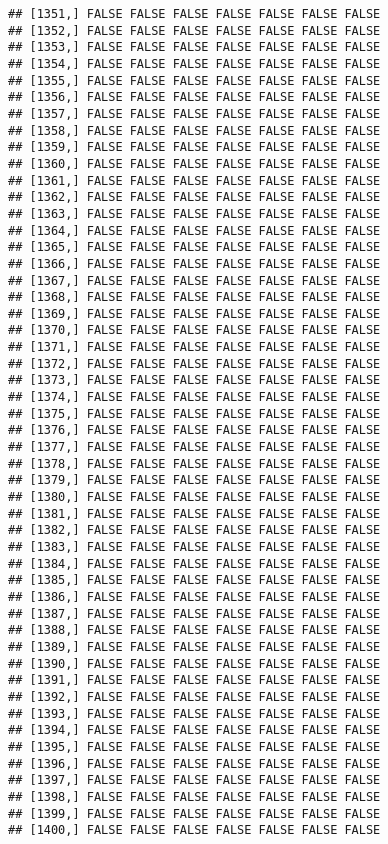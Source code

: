 \documentclass[
]{article}
\begin{document}
\begin{verbatim}
## [1351,] FALSE FALSE FALSE FALSE FALSE FALSE FALSE
## [1352,] FALSE FALSE FALSE FALSE FALSE FALSE FALSE
## [1353,] FALSE FALSE FALSE FALSE FALSE FALSE FALSE
## [1354,] FALSE FALSE FALSE FALSE FALSE FALSE FALSE
## [1355,] FALSE FALSE FALSE FALSE FALSE FALSE FALSE
## [1356,] FALSE FALSE FALSE FALSE FALSE FALSE FALSE
## [1357,] FALSE FALSE FALSE FALSE FALSE FALSE FALSE
## [1358,] FALSE FALSE FALSE FALSE FALSE FALSE FALSE
## [1359,] FALSE FALSE FALSE FALSE FALSE FALSE FALSE
## [1360,] FALSE FALSE FALSE FALSE FALSE FALSE FALSE
## [1361,] FALSE FALSE FALSE FALSE FALSE FALSE FALSE
## [1362,] FALSE FALSE FALSE FALSE FALSE FALSE FALSE
## [1363,] FALSE FALSE FALSE FALSE FALSE FALSE FALSE
## [1364,] FALSE FALSE FALSE FALSE FALSE FALSE FALSE
## [1365,] FALSE FALSE FALSE FALSE FALSE FALSE FALSE
## [1366,] FALSE FALSE FALSE FALSE FALSE FALSE FALSE
## [1367,] FALSE FALSE FALSE FALSE FALSE FALSE FALSE
## [1368,] FALSE FALSE FALSE FALSE FALSE FALSE FALSE
## [1369,] FALSE FALSE FALSE FALSE FALSE FALSE FALSE
## [1370,] FALSE FALSE FALSE FALSE FALSE FALSE FALSE
## [1371,] FALSE FALSE FALSE FALSE FALSE FALSE FALSE
## [1372,] FALSE FALSE FALSE FALSE FALSE FALSE FALSE
## [1373,] FALSE FALSE FALSE FALSE FALSE FALSE FALSE
## [1374,] FALSE FALSE FALSE FALSE FALSE FALSE FALSE
## [1375,] FALSE FALSE FALSE FALSE FALSE FALSE FALSE
## [1376,] FALSE FALSE FALSE FALSE FALSE FALSE FALSE
## [1377,] FALSE FALSE FALSE FALSE FALSE FALSE FALSE
## [1378,] FALSE FALSE FALSE FALSE FALSE FALSE FALSE
## [1379,] FALSE FALSE FALSE FALSE FALSE FALSE FALSE
## [1380,] FALSE FALSE FALSE FALSE FALSE FALSE FALSE
## [1381,] FALSE FALSE FALSE FALSE FALSE FALSE FALSE
## [1382,] FALSE FALSE FALSE FALSE FALSE FALSE FALSE
## [1383,] FALSE FALSE FALSE FALSE FALSE FALSE FALSE
## [1384,] FALSE FALSE FALSE FALSE FALSE FALSE FALSE
## [1385,] FALSE FALSE FALSE FALSE FALSE FALSE FALSE
## [1386,] FALSE FALSE FALSE FALSE FALSE FALSE FALSE
## [1387,] FALSE FALSE FALSE FALSE FALSE FALSE FALSE
## [1388,] FALSE FALSE FALSE FALSE FALSE FALSE FALSE
## [1389,] FALSE FALSE FALSE FALSE FALSE FALSE FALSE
## [1390,] FALSE FALSE FALSE FALSE FALSE FALSE FALSE
## [1391,] FALSE FALSE FALSE FALSE FALSE FALSE FALSE
## [1392,] FALSE FALSE FALSE FALSE FALSE FALSE FALSE
## [1393,] FALSE FALSE FALSE FALSE FALSE FALSE FALSE
## [1394,] FALSE FALSE FALSE FALSE FALSE FALSE FALSE
## [1395,] FALSE FALSE FALSE FALSE FALSE FALSE FALSE
## [1396,] FALSE FALSE FALSE FALSE FALSE FALSE FALSE
## [1397,] FALSE FALSE FALSE FALSE FALSE FALSE FALSE
## [1398,] FALSE FALSE FALSE FALSE FALSE FALSE FALSE
## [1399,] FALSE FALSE FALSE FALSE FALSE FALSE FALSE
## [1400,] FALSE FALSE FALSE FALSE FALSE FALSE FALSE

\end{verbatim}
\end{document}
